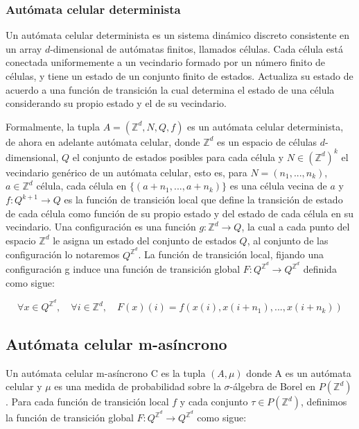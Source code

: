 \documentclass[../proyecto.tex]{memoir}
\begin{document}
\subsubsection{Autómata celular determinista}
Un autómata celular determinista es un sistema dinámico discreto consistente en un array $d$-dimensional de autómatas finitos, llamados células. Cada célula está conectada uniformemente a un vecindario formado por un número finito de células, y tiene un estado de un conjunto finito de estados. Actualiza su estado de acuerdo a una función de transición la cual determina el estado de una célula considerando su propio estado y el de su vecindario. 

Formalmente, la tupla $A=(\mathds{Z}^{d}, N, Q, f)$ es un autómata celular determinista, de ahora en adelante autómata celular, donde $\mathds{Z} ^{d}$ es un espacio de células $d$-dimensional, $Q$ el conjunto de estados posibles para cada célula y $N \in (\mathds{Z}^{d})^{k}$ el vecindario genérico de un autómata celular, esto es, para $N=(n_{1},...,n_{k})$, $a \in \mathds{Z} ^{d}$ célula, cada célula en $\{(a+n_{1},...,a+n_{k})\}$ es una célula vecina de $a$ y $f:Q^{k+1} \rightarrow Q$ es la función de transición local que define la transición de estado de cada célula como función de su propio estado y del estado de cada célula en su vecindario. Una configuración es una función $g: \mathds{Z}^{d} \rightarrow Q$, la cual a cada punto del espacio $\mathds{Z}^{d}$ le asigna un estado del conjunto de estados $Q$, al conjunto de las configuración lo notaremos $Q^{\mathds{Z}^{d}}$. La función de transición local, fijando una configuración g induce una función de transición global $F:Q^{\mathds{Z}^{d}} \rightarrow Q^{\mathds{Z}^{d}}$ definida como sigue:

\begin{equation*}
\forall x \in Q^{\mathds{Z}^{d}}, \quad \forall i \in \mathds{Z}^{d}, \quad F(x)(i) = f(x(i),x(i+n_{1}),...,x(i+n_{k}))
\end{equation*}

\subsection{Autómata celular m-asíncrono}

Un autómata celular m-asíncrono C es la tupla $(A, \mu)$ donde A es un autómata celular y $\mu$ es una medida de probabilidad sobre la $\sigma$-álgebra de Borel en $P(\mathds{Z}^{d})$. 
Para cada función de transición local $f$ y cada conjunto $\tau \in P(\mathds{Z}^{d})$, definimos la función de transición global $F:Q^{\mathds{Z}^{d}} \rightarrow Q^{\mathds{Z}^{d}}$ como sigue:
\end{document}

